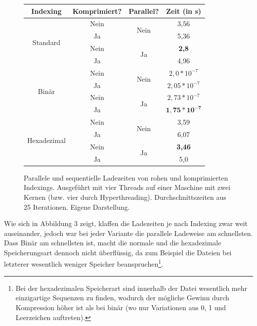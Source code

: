 \documentclass[a4paper,12pt]{scrartcl}
\begin{document}
    \begin{figure}[h]
        \centering
        \begin{tabular}{c||c|c|c}
            Indexing & Komprimiert? & Parallel? & Zeit (in s) \\
            \hline \hline
            \multirow{4}{*}{Standard} & \textcolor{BrickRed}{Nein} & \multirow{2}{*}{\textcolor{BrickRed}{Nein}} & 3,56 \\
            & \textcolor{OliveGreen}{Ja} & & 5,36 \\ \cline{2-3}
            & \textcolor{BrickRed}{Nein} & \multirow{2}{*}{\textcolor{OliveGreen}{Ja}} & \textbf{2,8} \\
            & \textcolor{OliveGreen}{Ja} & & 4,96 \\
            \hline
            \multirow{4}{*}{Binär} & \textcolor{BrickRed}{Nein} & \multirow{2}{*}{\textcolor{BrickRed}{Nein}} & $2,0 * 10^{-7}$\\
            & \textcolor{OliveGreen}{Ja} & & $2,05 * 10^{-7}$ \\ \cline{2-3}
            & \textcolor{BrickRed}{Nein} & \multirow{2}{*}{\textcolor{OliveGreen}{Ja}} & $2,73 * 10^{-7}$ \\
            & \textcolor{OliveGreen}{Ja} & & $\mathbf{1,75 * 10^{-7}}$ \\
            \hline
            \multirow{4}{*}{Hexadezimal} & \textcolor{BrickRed}{Nein} & \multirow{2}{*}{\textcolor{BrickRed}{Nein}} & 3,59 \\
            & \textcolor{OliveGreen}{Ja} & & 6,07 \\ \cline{2-3}
            & \textcolor{BrickRed}{Nein} & \multirow{2}{*}{\textcolor{OliveGreen}{Ja}} & \textbf{3,46} \\
            & \textcolor{OliveGreen}{Ja} & & 5,0 \\
        \end{tabular}
        \caption{Parallele und sequentielle Ladezeiten von rohen und komprimierten Indexings. Ausgeführt mit vier Threads auf einer Maschine mit zwei Kernen (bzw. vier durch Hyperthreading). Durchschnittszeiten aus 25 Iterationen. Eigene Darstellung.}
    \end{figure}

    Wie sich in Abbildung 3 zeigt, klaffen die Ladezeiten je nach Indexing zwar weit auseinander, jedoch war bei jeder Variante die parallele Ladeweise am schnellsten. Dass Binär am schnellsten ist, macht die normale und die hexadezimale Speicherungsart dennoch nicht überflüssig, da zum Beispiel die Dateien bei letzterer wesentlich weniger Speicher beanspruchen\footnote{Bei der hexadezimalen Speicherart sind innerhalb der Datei wesentlich mehr einzigartige Sequenzen zu finden, wodurch der mögliche Gewinn durch Kompression höher ist als bei binär (wo nur Variationen aus 0, 1 und Leerzeichen auftreten).}. 
\end{document}
